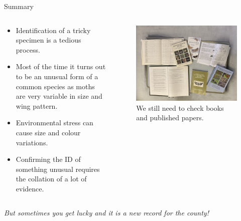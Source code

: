 \documentclass[
  ignorenonframetext,
]{beamer}
\providecommand{\tightlist}{%
  \setlength{\itemsep}{0pt}\setlength{\parskip}{0pt}}
\begin{document}
\begin{frame}{Summary}
\protect\hypertarget{summary}{}
\begin{columns}[T]
\begin{column}{0.5\textwidth}
\begin{itemize}
\tightlist
\item
  Identification of a tricky specimen is a tedious process.
\item
  Most of the time it turns out to be an unusual form of a common
  species as moths are very variable in size and wing pattern.
\item
  Environmental stress can cause size and colour variations.
\item
  Confirming the ID of something unusual requires the collation of a lot
  of evidence.
\end{itemize}
\end{column}

\begin{column}{0.5\textwidth}
\begin{figure}
\centering
\includegraphics{./images/research.jpg}
\caption{We still need to check books and published papers.}
\end{figure}
\end{column}
\end{columns}

\emph{But sometimes you get lucky and it is a new record for the
county!}
\end{frame}
\end{document}
